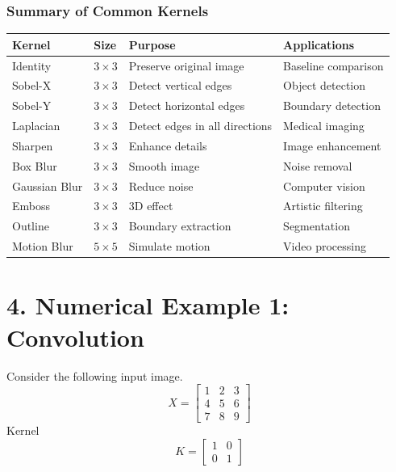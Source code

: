 \documentclass[11pt]{article}
\begin{document}
\subsubsection*{Summary of Common Kernels}

\begin{center}
\renewcommand{\arraystretch}{1.3}
\begin{tabular}{|p{3cm}|p{2cm}|p{4cm}|p{4cm}|}
\hline
\textbf{Kernel} & \textbf{Size} & \textbf{Purpose} & \textbf{Applications}\\
\hline
Identity & $3\times3$ & Preserve original image & Baseline comparison\\
\hline
Sobel-X & $3\times3$ & Detect vertical edges & Object detection\\
\hline
Sobel-Y & $3\times3$ & Detect horizontal edges & Boundary detection\\
\hline
Laplacian & $3\times3$ & Detect edges in all directions & Medical imaging\\
\hline
Sharpen & $3\times3$ & Enhance details & Image enhancement\\
\hline
Box Blur & $3\times3$ & Smooth image & Noise removal\\
\hline
Gaussian Blur & $3\times3$ & Reduce noise & Computer vision\\
\hline
Emboss & $3\times3$ & 3D effect & Artistic filtering\\
\hline
Outline & $3\times3$ & Boundary extraction & Segmentation\\
\hline
Motion Blur & $5\times5$ & Simulate motion & Video processing\\
\hline
\end{tabular}
\end{center}


\section*{4. Numerical Example 1: Convolution}

Consider the following input image.
\[
X=
\begin{bmatrix}
1&2&3\\
4&5&6\\
7&8&9
\end{bmatrix}
\]
Kernel
\[
K=
\begin{bmatrix}
1&0\\
0&1
\end{bmatrix}
\]
\end{document}
